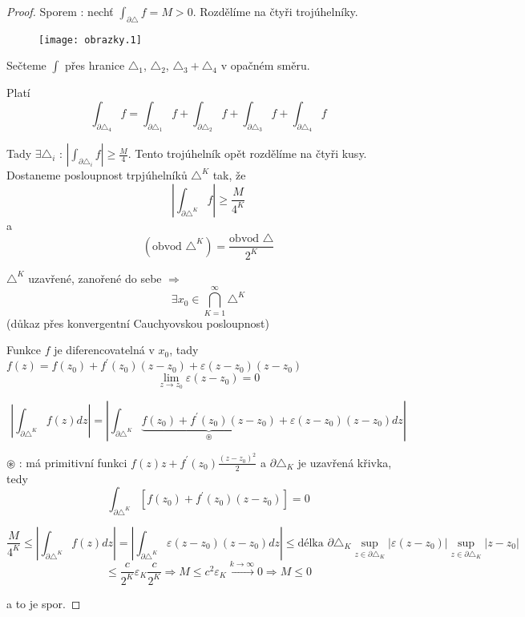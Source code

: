 \begin{proof}
Sporem : nechť $\int_{\partial \triangle} f = M > 0$. Rozdělíme na čtyři trojúhelníky.

\begin{figure}[h]
\begin{center}
\texttt{[image: obrazky.1]}
\end{center}
\end{figure}

Sečteme $\int$ přes hranice $\triangle_1$, $\triangle_2$, $\triangle_3 + \triangle_4$ v opačném směru.

Platí 
$$\int_{\partial \triangle_4} f = \int_{\partial \triangle_1} f + \int_{\partial \triangle_2} f + \int_{\partial \triangle_3} f + \int_{\partial \triangle_4} f$$

Tady $\exists \triangle_i \textrm{ : } \left| \int_{\partial \triangle_i} f \right| \geq \frac{M}{4}$. Tento trojúhelník opět rozdělíme na čtyři kusy. Dostaneme posloupnost trpjúhelníků $\triangle^K$ tak, že 
$$\left| \int_{\partial \triangle^K} f \right| \geq \frac{M}{4^K}$$
a
$$(\textrm{obvod $\triangle^K$}) = \frac{\textrm{obvod $\triangle$}}{2^K}$$

$\triangle^K$ uzavřené, zanořené do sebe $\Rightarrow$ 
$$\exists x_0 \in \bigcap_{K=1}^{\infty} \triangle^K$$
(důkaz přes konvergentní Cauchyovskou posloupnost)

Funkce $f$ je diferencovatelná v $x_0$, tady $f(z) = f(z_0) + f^\prime(z_0)(z-z_0) + \varepsilon (z-z_0)(z-z_0)$
$$\lim_{z \to z_0} \varepsilon (z-z_0) = 0$$

$$\left| \int_{\partial \triangle^K} f(z) dz \right| = \left| \int_{\partial \triangle^K} \underbrace{f(z_0) + f^\prime (z_0)(z-z_0)}_\circledast + \varepsilon (z-z_0) (z-z_0) dz \right|$$

$\circledast$ : má primitivní funkci $f(z)z + f^\prime(z_0) \frac{(z-z_0)^2}{2}$ a $\partial \triangle_K$ je uzavřená křivka, tedy 
$$\int_{\partial \triangle^K} \left[ f(z_0) + f^\prime (z_0) (z-z_0) \right] = 0$$

$$\frac{M}{4^K} \leq \left| \int_{\partial \triangle^K} f(z) dz \right| = \left| \int_{\partial \triangle^K} \varepsilon (z-z_0) (z-z_0) dz \right| \leq \textrm{délka } \partial \triangle_K \sup_{z \in \partial \triangle_K} \left| \varepsilon (z-z_0) \right| \sup_{z \in \partial \triangle_K} \left| z-z_0 \right| $$
$$ \leq \frac{c}{2^K} \varepsilon_K \frac{c}{2^K} \Rightarrow M \leq c^2 \varepsilon_K \overset{k \to \infty}{\rightarrow} 0 \Rightarrow M \leq 0$$

a to je spor.
\end{proof}


